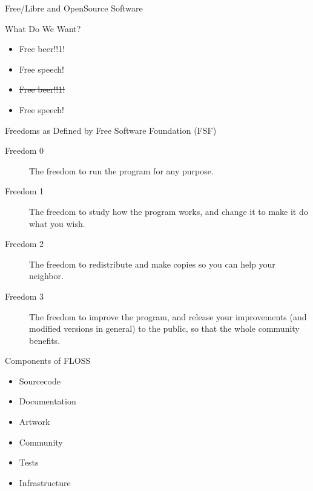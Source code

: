 \documentclass{beamer}
\begin{document}
\begin{frame}{Free/Libre and OpenSource Software}
    \begin{block}{What Do We Want?}
        {
            \begin{itemize}
                \item Free beer!!1!
                \item<2-> Free speech!
            \end{itemize}
        }

        {
            \begin{itemize}
                \item \sout{Free beer!!1!}
                \item Free speech!
            \end{itemize}
        }
    \end{block}

    {
        \begin{block}{Freedoms as Defined by Free Software Foundation (FSF)}
            \begin{description}
                \item[Freedom 0] The freedom to run the program for any
                    purpose.
                \item[Freedom 1] The freedom to study how the program
                    works, and change it to make it do what you wish.
                \item[Freedom 2] The freedom to redistribute and make
                    copies so you can help your neighbor.
                \item[Freedom 3] The freedom to improve the program, and
                    release your improvements (and modified versions in
                    general) to the public, so that the whole community
                    benefits.
            \end{description}
        \end{block}
    }
\end{frame}

\begin{frame}{Components of FLOSS}
    \begin{itemize}
        \item Sourcecode
        \item Documentation
        \item Artwork
        \item Community
        \item Tests
        \item Infrastructure
    \end{itemize}
\end{frame}
\end{document}
